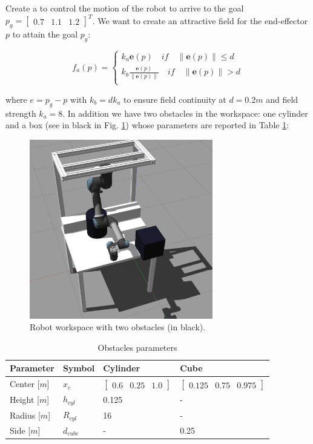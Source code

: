 \documentclass[11pt]{article}
\newcommand{\mat}[1]{\ensuremath{\begin{bmatrix}#1\end{bmatrix}}}	%
\begin{document}
Create a  to control the motion of the robot to arrive to the goal $p_g = \mat{0.7& 1.1& 1.2}^T$.
We want to create an attractive field for the end-effector $p$ to attain the goal $p_g$:

\begin{equation}
f_a(p) = \begin{cases}
k_{a} \mathbf{e}(p)  \quad if \quad  \|\mathbf{e}(p)\| \leq d \\
k_{b} \frac{\mathbf{e}(p)}{\|\mathbf{e}(p)\|}   \quad if \quad  \|\mathbf{e}(p)\| > d \\		
\end{cases}
\end{equation}

where $e = p_g -p$ with $k_{b} = d k_{a}$ to ensure field continuity at $d = 0.2 m$ and field strength $k_a = 8$.
In addition we have  two obstacles in the workspace: one cylinder and a box (see in black in Fig. \ref{fig:workspace}) whose parameters 
are reported in Table  \ref{tab:obstacles}: 

\begin{figure}[H]
	\centering
	\includegraphics[width=8cm]{pics/workbench.png}
	\caption{Robot workspace with two obstacles (in black).}
	\label{fig:workspace}
\end{figure} 


\begin{table}[h!]
	\caption{Obstacles parameters}
	\begin{center}
		\begin{tabular}{@{} l l l l @{}}
		\hline\hline
			\textbf{Parameter} & {\textbf{Symbol}} &Cylinder    & Cube \\ 
			\hline
			Center [$m$] & $x_c$&  $\mat{0.6 &0.25&1.0}$  & $\mat{0.125 &0.75& 0.975}$  \\
			Height [$m$] & $h_{cyl}$&  0.125  & -    \\
			Radius [$m$]& $R_{cyl}$&  16  & -    \\
			Side [$m$]  & $d_{cube}$& -   & 0.25    \\
		\hline\hline
		\end{tabular}
		\label{tab:obstacles}
	\end{center}
\end{table}
%
\end{document}
